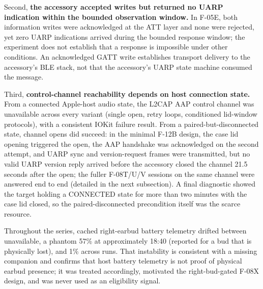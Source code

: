 \documentclass[11pt,letterpaper]{article}
\begin{document}
Second, \textbf{the accessory accepted writes but returned no UARP indication within the bounded observation window.} In F-05E, both information writes were acknowledged at the ATT layer and none were rejected, yet zero UARP indications arrived during the bounded response window; the experiment does not establish that a response is impossible under other conditions. An acknowledged GATT write establishes transport delivery to the accessory's BLE stack, not that the accessory's UARP state machine consumed the message.

Third, \textbf{control-channel reachability depends on host connection state.} From a connected Apple-host audio state, the L2CAP AAP control channel was unavailable across every variant (single open, retry loops, conditioned lid-window protocols), with a consistent IOKit failure result. From a paired-but-disconnected state, channel opens did succeed: in the minimal F-12B design, the case lid opening triggered the open, the AAP handshake was acknowledged on the second attempt, and UARP sync and version-request frames were transmitted, but no valid UARP version reply arrived before the accessory closed the channel 21.5 seconds after the open; the fuller F-08T/U/V sessions on the same channel were answered end to end (detailed in the next subsection). A final diagnostic showed the target holding a CONNECTED state for more than two minutes with the case lid closed, so the paired-disconnected precondition itself was the scarce resource.

Throughout the series, cached right-earbud battery telemetry drifted between unavailable, a phantom 57\% at approximately 18:40 (reported for a bud that is physically lost), and 1\% across runs. That instability is consistent with a missing companion and confirms that host battery telemetry is not proof of physical earbud presence; it was treated accordingly, motivated the right-bud-gated F-08X design, and was never used as an eligibility signal.
\end{document}
